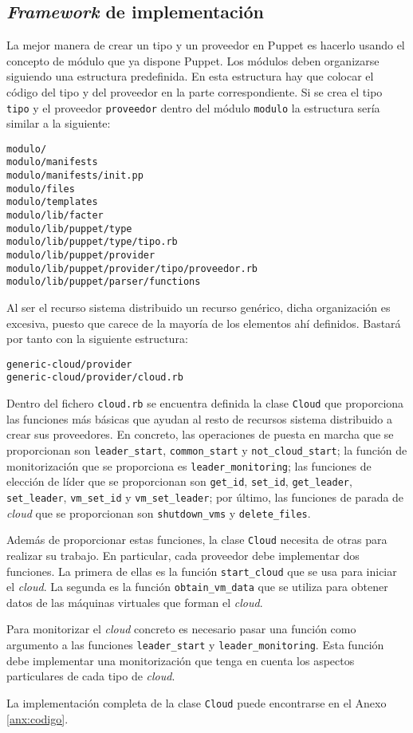 \subsection{\emph{Framework} de implementación}
\label{sec:modelado-framework}


La mejor manera de crear un tipo y un proveedor en Puppet es hacerlo usando el concepto de módulo que ya dispone Puppet. Los módulos deben organizarse siguiendo una estructura predefinida. En esta estructura hay que colocar el código del tipo y del proveedor en la parte correspondiente. Si se crea el tipo \texttt{tipo} y el proveedor \texttt{proveedor} dentro del módulo \texttt{modulo} la estructura sería similar a la siguiente:

\begin{lstlisting}
modulo/
modulo/manifests
modulo/manifests/init.pp
modulo/files
modulo/templates
modulo/lib/facter
modulo/lib/puppet/type
modulo/lib/puppet/type/tipo.rb
modulo/lib/puppet/provider
modulo/lib/puppet/provider/tipo/proveedor.rb
modulo/lib/puppet/parser/functions
\end{lstlisting}

Al ser el recurso sistema distribuido un recurso genérico, dicha organización es excesiva, puesto que carece de la mayoría de los elementos ahí definidos. Bastará por tanto con la siguiente estructura:

\begin{lstlisting}
generic-cloud/provider
generic-cloud/provider/cloud.rb
\end{lstlisting}

Dentro del fichero \texttt{cloud.rb} se encuentra definida la clase \texttt{Cloud} que proporciona las funciones más básicas que ayudan al resto de recursos sistema distribuido a crear sus proveedores. En concreto, las operaciones de puesta en marcha que se proporcionan son \texttt{leader\_start}, \texttt{common\_start} y \texttt{not\_cloud\_start}; la función de monitorización que se proporciona es \texttt{leader\_monitoring}; las funciones de elección de líder que se proporcionan son \texttt{get\_id}, \texttt{set\_id}, \texttt{get\_leader}, \texttt{set\_leader}, \texttt{vm\_set\_id} y \texttt{vm\_set\_leader}; por último, las funciones de parada de \emph{cloud} que se proporcionan son \texttt{shutdown\_vms} y \texttt{delete\_files}.

Además de proporcionar estas funciones, la clase \texttt{Cloud} necesita de otras para realizar su trabajo. En particular, cada proveedor debe implementar dos funciones. La primera de ellas es la función \texttt{start\_cloud} que se usa para iniciar el \emph{cloud}. La segunda es la función \texttt{obtain\_vm\_data} que se utiliza para obtener datos de las máquinas virtuales que forman el \emph{cloud}.

Para monitorizar el \emph{cloud} concreto es necesario pasar una función como argumento a las funciones \texttt{leader\_start} y \texttt{leader\_monitoring}. Esta función debe implementar una monitorización que tenga en cuenta los aspectos particulares de cada tipo de \emph{cloud}.

La implementación completa de la clase \texttt{Cloud} puede encontrarse en el Anexo \ref{anx:codigo}.
